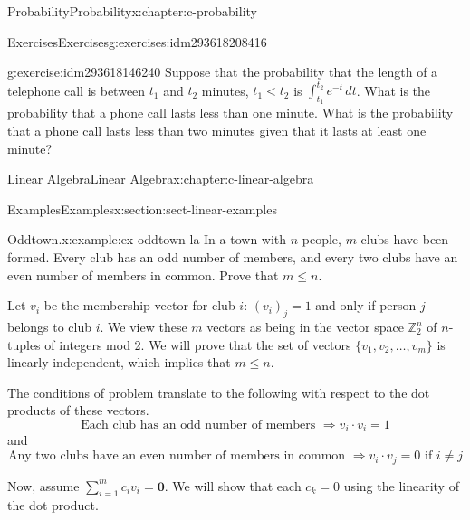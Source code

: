 \documentclass[twoside,10pt,]{book}
\numberwithin{equation}{section}
\renewcommand{\vec}[1]{\mathbf{#1}}
\newcommand{\lt}{<}
\begin{document}
\begin{chapterptx}{Probability}{}{Probability}{}{}{x:chapter:c-probability}
\begin{exercises-section}{Exercises}{}{Exercises}{}{}{g:exercises:idm293618208416}
\begin{divisionexercise}{13}{}{}{g:exercise:idm293618146240}
Suppose that the probability that the length of a telephone call is between \(t_1\) and \(t_2\) minutes,  \(t_1 \lt t_2\) is \(\int_{t_1}^{t_2} e^{-t} \, dt\).   What is the probability that a phone call lasts less than one minute.  What is the probability that a phone call lasts less than two minutes given that it lasts at least one minute?%
\end{divisionexercise}%
\end{exercises-section}
\end{chapterptx}
%
%
\typeout{************************************************}
\typeout{************************************************}
%
\begin{chapterptx}{Linear Algebra}{}{Linear Algebra}{}{}{x:chapter:c-linear-algebra}
%
%
\typeout{************************************************}
\typeout{************************************************}
%
\begin{sectionptx}{Examples}{}{Examples}{}{}{x:section:sect-linear-examples}
\begin{example}{Oddtown.}{x:example:ex-oddtown-la}%
In a town with \(n\) people, \(m\) clubs have been formed. Every club has an odd number of members, and every two clubs have an even number of members in common. Prove that \(m \leq  n\).%
\par
Let \(v_i\) be the membership vector for club \(i\):  \((v_i)_j = 1\) and only if person  \(j\) belongs to club \(i\). We view these \(m\) vectors as being in the vector space \(\mathbb{Z}_2^n\) of \(n\)-tuples of integers mod 2.  We will prove that the set of vectors \(\{v_1, v_2, \dots, v_m\}\) is linearly independent, which implies that \(m \leq  n\).%
\par
The conditions of problem translate to the following with respect to the dot products of these vectors.%
\begin{equation*}
\textrm{Each club has an odd number of members }\Rightarrow  v_i\cdot v_i = 1
\end{equation*}
and%
\begin{equation*}
\textrm{Any two clubs have an even number of members in common }\Rightarrow  v_i\cdot v_j = 0 \textrm{ if }i\neq j
\end{equation*}
%
\par
Now, assume  \(\sum_{i=1}^m c_i v_i = \vec{0}\).  We will show that each \(c_k = 0\) using the linearity of the dot product.%
\begin{equation*}
\begin{split}

\end{split}
\end{equation*}
\end{example}
\end{sectionptx}
\end{chapterptx}
\end{document}
